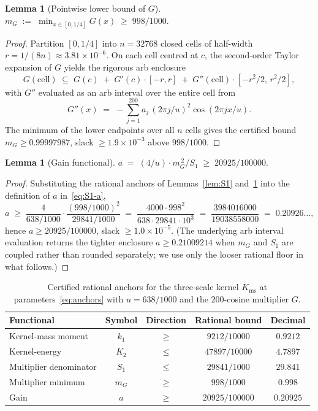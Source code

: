 \documentclass[11pt, letterpaper]{article}
\theoremstyle{paperplain}
\newtheorem{lemma}[theorem]{Lemma}
\theoremstyle{paperdef}
\newcommand{\Kms}{K_{\mathrm{ms}}}
\begin{document}
\begin{lemma}[Pointwise lower bound of $G$]
\label{lem:mG}
\(
  m_G \;:=\; \min_{x\in[0,1/4]}G(x) \;\ge\; 998/1000.
\)
\end{lemma}

\begin{proof}
Partition $[0,1/4]$ into $n=32768$ closed cells of half-width
$r=1/(8n)\approx 3.81\times 10^{-6}$.  On each cell centred at $c$,
the second-order Taylor expansion of $G$ yields the rigorous arb
enclosure
\[
  G(\mathrm{cell})\;\subseteq\;
    G(c)\;+\;G'(c)\cdot[-r,r]\;+\;G''(\mathrm{cell})\cdot[-r^{2}/2,\,r^{2}/2],
\]
with $G''$ evaluated as an arb interval over the entire cell from
\[
  G''(x) \;=\; -\sum_{j=1}^{200}a_j\,(2\pi j/u)^{2}\cos(2\pi jx/u).
\]
The minimum of the lower endpoints over all $n$ cells gives the
certified bound $m_G\ge 0.99997987$, slack $\ge 1.9\times 10^{-3}$
above $998/1000$.
\end{proof}

\begin{lemma}[Gain functional]
\label{lem:a}
\(
  a \;=\; (4/u)\cdot m_G^{\,2}/S_1 \;\ge\; 20925/100000.
\)
\end{lemma}

\begin{proof}
Substituting the rational anchors of
Lemmas~\ref{lem:S1} and~\ref{lem:mG} into the definition of $a$
in~\eqref{eq:S1-a},
\[
  a
  \;\ge\;
  \frac{4}{638/1000}\cdot\frac{(998/1000)^{2}}{29841/1000}
  \;=\;
  \frac{4000\cdot 998^{2}}{638\cdot 29841\cdot 10^{3}}
  \;=\;
  \frac{3984016000}{19038558000}
  \;=\; 0.20926\ldots,
\]
hence $a\ge 20925/100000$, slack $\ge 1.0\times 10^{-5}$.  (The
underlying arb interval evaluation returns the tighter enclosure
$a\ge 0.21009214$ when $m_G$ and $S_1$ are coupled rather than
rounded separately; we use only the looser rational floor in what
follows.)
\end{proof}

\begin{table}[ht]
\centering
\begin{tabular}{lcccc}
  \toprule
  Functional & Symbol & Direction & Rational bound & Decimal \\
  \midrule
  Kernel-mass moment   & $k_1$ & $\ge$ & $9212/10000$    & $0.9212$ \\
  Kernel-energy        & $K_2$ & $\le$ & $47897/10000$   & $4.7897$ \\
  Multiplier denominator & $S_1$ & $\le$ & $29841/1000$  & $29.841$ \\
  Multiplier minimum   & $m_G$ & $\ge$ & $998/1000$      & $0.998$  \\
  Gain                 & $a$   & $\ge$ & $20925/100000$  & $0.20925$ \\
  \bottomrule
\end{tabular}
\caption[Certified rational anchors for the three-scale kernel.]{Certified rational anchors for the three-scale kernel
$\Kms$ at parameters~\eqref{eq:anchors} with $u=638/1000$ and the
$200$-cosine multiplier $G$.}
\label{tab:anchors}
\end{table}
\end{document}
